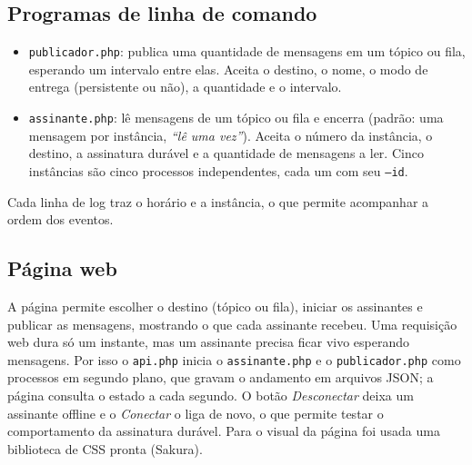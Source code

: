 \documentclass[11pt,a4paper]{article}
\begin{document}
\subsection{Programas de linha de comando}
\begin{itemize}
  \item \texttt{publicador.php}: publica uma quantidade de mensagens em um t\'opico ou
        fila, esperando um intervalo entre elas. Aceita
        o destino, o nome, o modo de entrega (persistente ou n\~ao), a quantidade e o
        intervalo.
  \item \texttt{assinante.php}: l\^e mensagens de um t\'opico ou fila e encerra (padr\~ao: uma
        mensagem por inst\^ancia, \emph{``l\^e uma vez''}). Aceita o n\'umero da inst\^ancia,
        o destino, a assinatura dur\'avel e a quantidade de mensagens a ler. Cinco
        inst\^ancias s\~ao cinco processos independentes, cada um com seu \texttt{--id}.
\end{itemize}
Cada linha de log traz o hor\'ario e a inst\^ancia, o que permite acompanhar a ordem dos
eventos.

\subsection{P\'agina web}
A p\'agina permite escolher o destino (t\'opico ou fila), iniciar os assinantes e
publicar as mensagens, mostrando o que cada assinante recebeu. Uma requisi\c{c}\~ao web dura
s\'o um instante, mas um assinante precisa ficar vivo esperando mensagens. Por isso o
\texttt{api.php} inicia o \texttt{assinante.php} e o \texttt{publicador.php} como
processos em segundo plano, que gravam o andamento em arquivos JSON; a p\'agina consulta
o estado a cada segundo. O bot\~ao \emph{Desconectar} deixa um assinante offline e o
\emph{Conectar} o liga de novo, o que permite testar o comportamento da assinatura
dur\'avel. Para o visual da p\'agina foi usada uma biblioteca de CSS pronta (Sakura).
\end{document}

